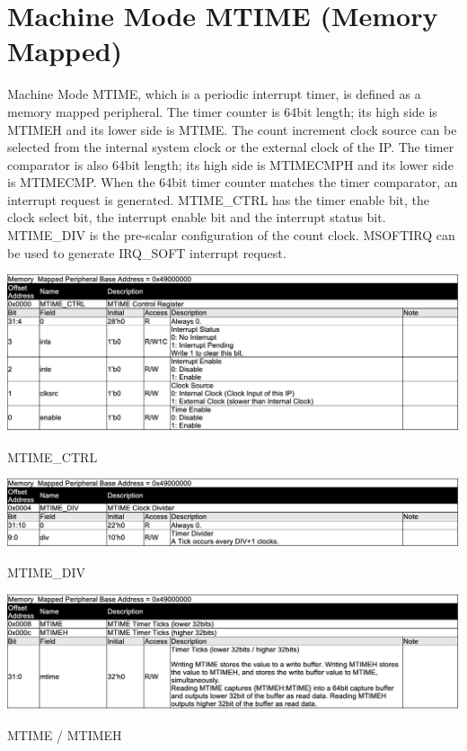 \section{Machine Mode MTIME (Memory Mapped)}

Machine Mode MTIME, which is a periodic interrupt timer, is defined as a memory mapped peripheral. The timer counter is 64bit length; its high side is MTIMEH and its lower side is MTIME. The count increment clock source can be selected from the internal system clock or the external clock of the IP. The timer comparator is also 64bit length; its high side is MTIMECMPH and its lower side is MTIMECMP. When the 64bit timer counter matches the timer comparator, an interrupt request is generated. MTIME\_CTRL has the timer enable bit, the clock select bit, the interrupt enable bit and the interrupt status bit. MTIME\_DIV is the pre-scalar configuration of the count clock. MSOFTIRQ can be used to generate IRQ\_SOFT interrupt request.

\begin{table}[H]
    \includegraphics[width=1.00\columnwidth]{./Table/MTIME_CTRL.png}
    \caption{MTIME\_CTRL}
    \label{tb:MTIME_CTRL}
\end{table}

\begin{table}[H]
    \includegraphics[width=1.00\columnwidth]{./Table/MTIME_DIV.png}
    \caption{MTIME\_DIV}
    \label{tb:MTIME_DIV}
\end{table}

\begin{table}[H]
    \includegraphics[width=1.00\columnwidth]{./Table/MTIME_TICK.png}
    \caption{MTIME / MTIMEH}
    \label{tb:MTIME_TICK}
\end{table}

